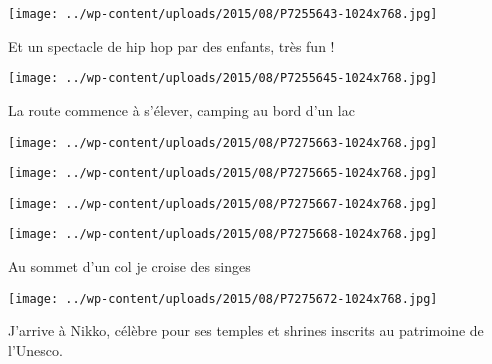\begin{center} \texttt{[image: ../wp-content/uploads/2015/08/P7255643-1024x768.jpg]} \end{center}

 

 Et un spectacle de hip hop par des enfants, très fun ! 

 

\begin{center} \texttt{[image: ../wp-content/uploads/2015/08/P7255645-1024x768.jpg]} \end{center}

 

 La route commence à s'élever, camping au bord d'un lac 

 

\begin{center} \texttt{[image: ../wp-content/uploads/2015/08/P7275663-1024x768.jpg]} \end{center}

 

 

\begin{center} \texttt{[image: ../wp-content/uploads/2015/08/P7275665-1024x768.jpg]} \end{center}

 

 

\begin{center} \texttt{[image: ../wp-content/uploads/2015/08/P7275667-1024x768.jpg]} \end{center}

 

 

\begin{center} \texttt{[image: ../wp-content/uploads/2015/08/P7275668-1024x768.jpg]} \end{center}

 

 Au sommet d'un col je croise des singes 

 

\begin{center} \texttt{[image: ../wp-content/uploads/2015/08/P7275672-1024x768.jpg]} \end{center}

 

 J'arrive à Nikko, célèbre pour ses temples et shrines inscrits au patrimoine de l'Unesco. 

